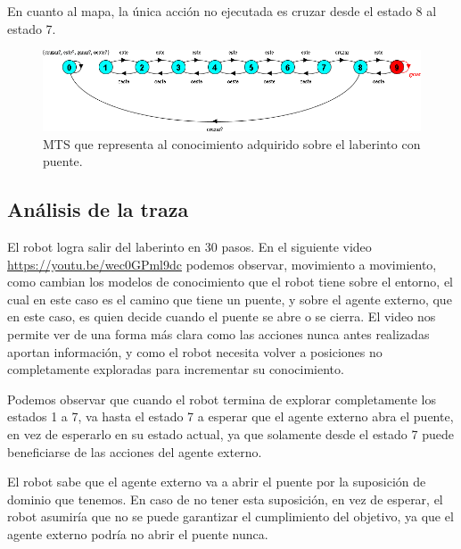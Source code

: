 En cuanto al mapa, la única acción no ejecutada es cruzar desde el estado 8 al estado 7.

\begin{figure}[H]
	\centering
		\includegraphics[width=1.0\textwidth]{Imagenes/Laberintos/puente_modelo_mapa.png}
	\caption{MTS que representa al conocimiento adquirido sobre el laberinto con puente.}
	\label{fig:puente_modelo_mapa}
\end{figure}

\subsection{Análisis de la traza}

El robot logra salir del laberinto en 30 pasos. En el siguiente video \url{https://youtu.be/wec0GPml9dc} podemos observar, movimiento a movimiento,
como cambian los modelos de conocimiento que el robot tiene sobre el entorno, el cual en este caso es el camino que tiene un puente, y sobre el agente
externo, que en este caso, es quien decide cuando el puente se abre o se cierra. El video nos permite ver de una forma más clara como las acciones
nunca antes realizadas aportan información, y como el robot necesita volver a posiciones no completamente exploradas para incrementar su conocimiento.

\vspace{\baselineskip}
Podemos observar que cuando el robot termina de explorar completamente los estados 1 a 7, 
va hasta el estado 7 a esperar que el agente externo abra el puente, en vez de esperarlo en su estado actual, ya que solamente desde el estado 7 
puede beneficiarse de las acciones del agente externo.

\vspace{\baselineskip}

El robot sabe que el agente externo va a abrir el puente por la suposición de dominio que tenemos. En caso de no tener esta suposición, 
en vez de esperar, el robot asumiría que no se puede garantizar el cumplimiento del objetivo, ya que el agente externo podría no abrir el puente nunca.

